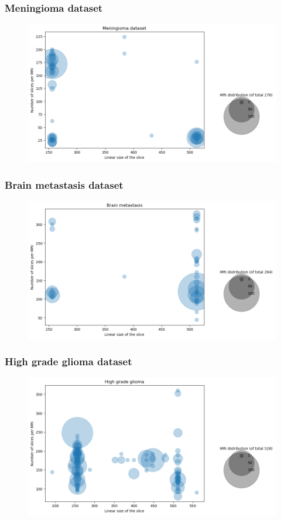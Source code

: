 \documentclass{beamer}
\begin{document}
\begin{frame}
\frametitle{Meningioma dataset}
\begin{figure}
	\centering
	\includegraphics[width=1.0\textwidth]{images/meningioma_dataset.png}
\end{figure}
\end{frame}



\begin{frame}
\frametitle{Brain metastasis dataset}
\begin{figure}
	\centering
	\includegraphics[width=1.0\textwidth]{images/brain_metastasis_dataset.png}
\end{figure}
\end{frame}


\begin{frame}
\frametitle{High grade glioma dataset}
\begin{figure}
	\centering
	\includegraphics[width=1.0\textwidth]{images/high_grade_glioma_dataset.png}
\end{figure}
\end{frame}
\end{document}
